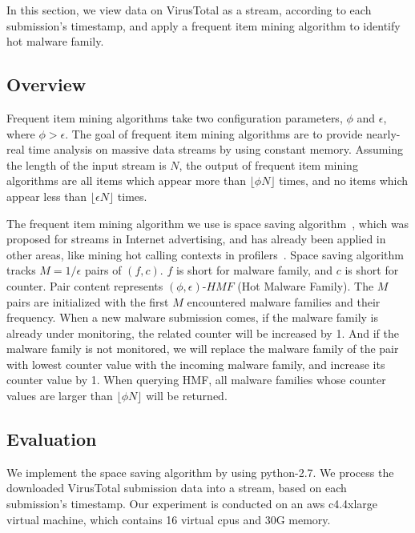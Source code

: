 In this section, we view data on VirusTotal as a stream, according to each submission's timestamp, 
and apply a frequent item mining algorithm to identify hot malware family. 

\subsection{Overview}

Frequent item mining algorithms take two configuration parameters, $\phi$ and $\epsilon$, where $\phi > \epsilon$. 
The goal of frequent item mining algorithms are to provide nearly-real time analysis on massive data streams by using constant memory. 
Assuming the length of the input stream is $N$, the output of frequent item mining algorithms 
are all items which appear more than $\lfloor \phi N \rfloor$ times, 
and no items which appear less than  $\lfloor \epsilon N \rfloor$ times. 

The frequent item mining algorithm we use is space saving algorithm~\cite{space-saving}, 
which was proposed for streams in Internet advertising, and has already been applied in other areas, 
like mining hot calling contexts in profilers~\cite{hot-calling-context}.
Space saving algorithm tracks $M=1/\epsilon$ pairs of $(f, c)$. 
$f$ is short for malware family, and $c$ is short for counter.  
Pair content represents $(\phi, \epsilon)\mbox{-}HMF$ (Hot Malware Family). 
The $M$ pairs are initialized with the first $M$ encountered malware families and their frequency. 
When a new malware submission comes, 
if the malware family is already under monitoring, 
the related counter will be increased by 1. 
And if the malware family is not monitored, 
we will replace the malware family of the pair with lowest counter value with the incoming malware family, 
and increase its counter value by 1. 
When querying HMF, 
all malware families whose counter values are larger than $\lfloor \phi N \rfloor$ will be returned. 

\subsection{Evaluation}
\label{sec:eval1}

We implement the space saving algorithm by using python-2.7.
We process the downloaded VirusTotal submission data into a stream, 
based on each submission's timestamp. 
Our experiment is conducted on an aws c4.4xlarge virtual machine, 
which contains 16 virtual cpus and 30G memory. 

